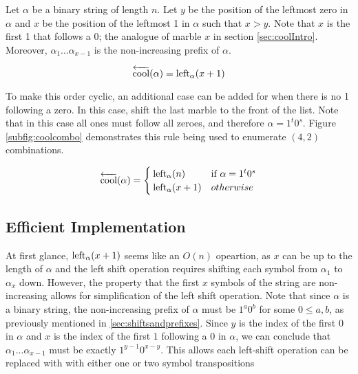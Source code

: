  Let $\alpha$ be a binary string of length $n$.
 Let $y$ be the position of the leftmost zero in $\alpha$ and $x$ be the position of the leftmost 1 in $\alpha$ such that $x > y$. Note that $x$ is the first 1 that follows a 0; the analogue of marble $x$ in section \ref{sec:coolIntro}.  Moreover, $\alpha_1...\alpha_{x-1}$ is the non-increasing prefix of $\alpha$.


 \begin{equation} \label{eq:coolCombo}
     \overleftarrow{\text{cool}}(\alpha) = \leftshift[\alpha]{x+1}
 \end{equation}

 To make this order cyclic, an additional case can be added for when there is no 1 following a zero. In this case, shift the last marble to the front of the list. Note that in this case all ones must follow all zeroes, and therefore $\alpha=1^t0^s$.  Figure \ref{subfig:coolcombo} demonstrates this rule being used to enumerate $(4,2)$ combinations.

\begin{equation}\label{eq:coolComboCyclic}
    \overleftarrow{\text{cool}}(\alpha) = \begin{cases}
	\leftshift[\alpha]{n} & \text{if } \alpha=1^t0^s \\
	\leftshift[\alpha]{x+1} & otherwise
\end{cases}
\end{equation}




\subsection{Efficient Implementation}

At first glance, $\leftshift[\alpha]{x+1}$ seems like an $O(n)$ opeartion, as $x$ can be up to the length of $\alpha$ and the left shift operation requires shifting each symbol from $\alpha_1$ to $\alpha_{x}$ down.  However, 
the property that the first $x$ symbols of the string are non-increasing allows for simplification of the left shift operation. Note that since $\alpha$ is a binary string, the non-increasing prefix of $\alpha$ must be $1^a0^b$ for some $0 \le a,b$, as previously mentioned in \ref{sec:shiftsandprefixes}. Since $y$ is the index of the first $0$ in $\alpha$ and $x$ is the index of the first $1$ following a $0$ in $\alpha$, we can conclude that $\alpha_1...\alpha_{x-1}$ must be exactly $1^{y-1}0^{x-y}$. This allows each left-shift operation can be replaced with with either one or two symbol transpositions 

